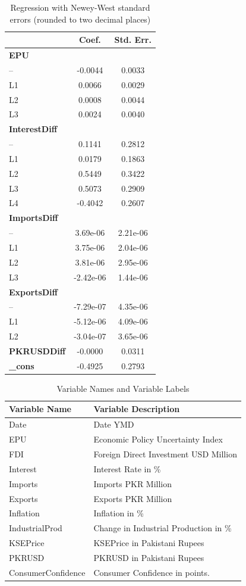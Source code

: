 \documentclass[11pt]{article}
\begin{document}
\begin{table}[ht]
\centering
\begin{tabular}{lcc}
\hline
 & Coef. & Std. Err. \\ 
\hline
\textbf{EPU} & & \\
-- & -0.0044 & 0.0033 \\
L1 & 0.0066 & 0.0029 \\
L2 & 0.0008 & 0.0044 \\
L3 & 0.0024 & 0.0040 \\
\textbf{InterestDiff} & & \\
-- & 0.1141 & 0.2812 \\
L1 & 0.0179 & 0.1863 \\
L2 & 0.5449 & 0.3422 \\
L3 & 0.5073 & 0.2909 \\
L4 & -0.4042 & 0.2607 \\
\textbf{ImportsDiff} & & \\
-- & 3.69e-06 & 2.21e-06 \\
L1 & 3.75e-06 & 2.04e-06 \\
L2 & 3.81e-06 & 2.95e-06 \\
L3 & -2.42e-06 & 1.44e-06 \\
\textbf{ExportsDiff} & & \\
-- & -7.29e-07 & 4.35e-06 \\
L1 & -5.12e-06 & 4.09e-06 \\
L2 & -3.04e-07 & 3.65e-06 \\
\textbf{PKRUSDDiff} & -0.0000 & 0.0311 \\
\textbf{\_cons} & -0.4925 & 0.2793 \\
\hline
\end{tabular}
\caption{Regression with Newey-West standard errors (rounded to two decimal places)}
\label{table:results_rounded}
\end{table}

\begin{table}[ht]
\centering
\begin{tabular}{ll}
\hline
Variable Name   & Variable Description \\
\hline
Date            & Date YMD \\
EPU             & Economic Policy Uncertainty Index\\
FDI             & Foreign Direct Investment USD Million \\
Interest        & Interest Rate in \% \\
Imports         & Imports PKR Million\\
Exports         & Exports PKR Million \\
Inflation       & Inflation in \% \\
IndustrialProd  & Change in Industrial Production in \% \\
KSEPrice        & KSEPrice in Pakistani Rupees\\
PKRUSD          & PKRUSD in Pakistani Rupees\\
ConsumerConfidence & Consumer Confidence in points.\\
\hline
\end{tabular}
\caption{Variable Names and Variable Labels}
\label{table:variables}
\end{table}
\end{document}

